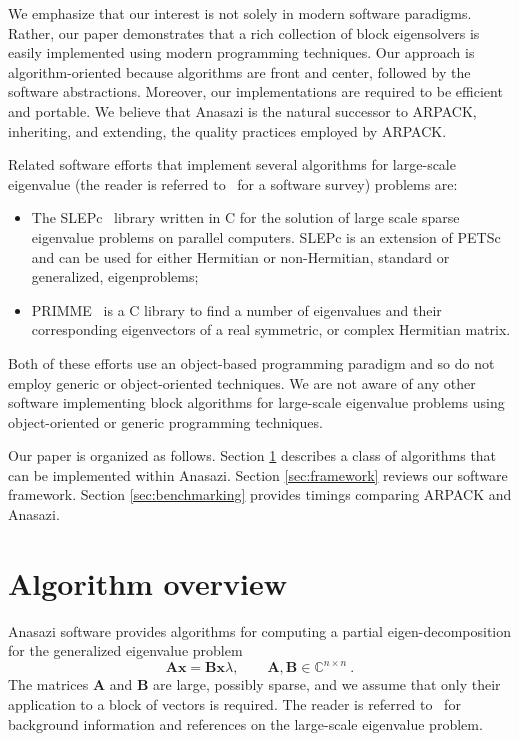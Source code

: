 \documentclass[acmtoms]{acmtrans2m}
\newcounter{algorithm}
\begin{document}
We emphasize that our interest is not solely in modern software
paradigms. Rather, our paper demonstrates that a rich collection of
block eigensolvers is easily implemented using modern programming
techniques. Our approach is algorithm-oriented \cite{muov:94}
because algorithms are front and center, followed by the software
abstractions. Moreover, our implementations are required to be
efficient and portable. We believe that Anasazi is the natural
successor to ARPACK, inheriting, and extending, the quality
practices employed by ARPACK.

Related software efforts that implement several algorithms for
large-scale eigenvalue (the reader is referred to~\cite{slepc:05}
for a software survey) problems are:
\begin{itemize}
\item
The SLEPc~\cite{slepc:06} library written in C for the solution of
large scale sparse eigenvalue problems on parallel computers. SLEPc
is an extension of PETSc~\cite{petsc-web-page} and can be used for
either Hermitian or non-Hermitian, standard or generalized,
eigenproblems;
\item
PRIMME~\cite{primme:06} is a C library to find a number of
eigenvalues and their corresponding eigenvectors of a real
symmetric, or complex Hermitian matrix.
\end{itemize}
Both of these efforts use an object-based programming paradigm and
so do not employ generic or object-oriented techniques.  We are not
aware of any other software implementing block algorithms for
large-scale eigenvalue problems using object-oriented or generic
programming techniques.

Our paper is organized as follows. Section
\ref{sec:algorithm-overview} describes a class of algorithms that
can be implemented within Anasazi. Section \ref{sec:framework}
reviews our software framework.  Section \ref{sec:benchmarking}
provides timings comparing ARPACK and Anasazi.


\section{Algorithm overview}
\label{sec:algorithm-overview}

Anasazi software provides algorithms for computing a partial
eigen-decomposition for the generalized eigenvalue problem
\begin{equation}  \label{eq:intro.1}
  \mathbf{A} \mathbf{x} = \mathbf{B} \mathbf{x} \lambda , \qquad
  \mathbf{A}, \mathbf{B} \in \mathbb{C}^{n\times n}\ .
\end{equation}
The matrices $\mathbf{A}$ and $\mathbf{B}$ are large, possibly
sparse, and we assume that only their application to a block of
vectors is required. The reader is referred
to~\cite{saad:92,sore:02,stew:01book,vors:02} for background
information and references on the large-scale eigenvalue problem.
\end{document}
